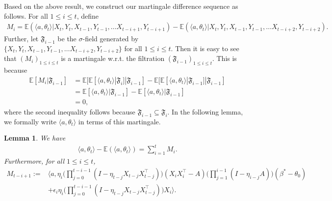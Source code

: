 \documentclass[11pt, reqno,english]{amsart}
\newtheorem{lemma}{Lemma}[section]
\begin{document}
Based on the above result, we construct our martingale difference sequence as follows. For all $1 \leq i \leq t$, define 
\begin{align*}
    M_{i} = \mathbb{E}(\langle a, \theta_t \rangle  | X_t, Y_t,X_{t-1}, Y_{t-1},\dots X_{t-i+1}, Y_{t-i+1})-\mathbb{E}(\langle a, \theta_t \rangle  | X_t,Y_t,X_{t-1}, Y_{t-1},\dots X_{t-i+2}, Y_{t-i+2}).
\end{align*}
Further, let $\mathfrak{F}_{i-1}$ be the $\sigma$-field generated by $\{X_t,Y_t, X_{t-1}, Y_{t-1},\dots X_{t-i+2}, Y_{t-i+2}\}$ for all $1 \leq i \leq t$. Then it is easy to see that $(M_i)_{1\leq i\leq t}$ is a martingale w.r.t. the filtration $(\mathfrak{F}_{i-1})_{1\leq i\leq t}$. This is because
\begin{align*}
\mathbb{E}[M_i | \mathfrak{F}_{i-1}] &=  \mathbb{E}[\mathbb{E}[\langle a, \theta_t \rangle| \mathfrak F_i] |  \mathfrak F_{i-1}] - \mathbb{E}[\mathbb{E}[\langle a, \theta_t \rangle| \mathfrak F_{i-1}] |  \mathfrak F_{i-1}]
\\
&= \mathbb{E}[\langle a, \theta_t \rangle| \mathfrak F_{i-1}] - \mathbb{E}[\langle a, \theta_t \rangle| \mathfrak F_{i-1}]
\\
&= 0,
\end{align*}
where the second inequality follows because $\mathfrak{F}_{i-1} \subseteq \mathfrak{F}_i$.
In the following lemma, we formally write $\langle a, \theta_t \rangle$ in terms of this martingale.

\begin{lemma}\label{lemma:martingalerep}
We have
\begin{align*}
    \langle a, \theta_t \rangle - \mathbb{E}(\langle a, \theta_t \rangle) = \sum_{i=1}^{t} M_i.
\end{align*}
Furthermore, for all $1 \leq i \leq t$,
\begin{align*}
    M_{t - i + 1} := &\bigg \langle a, \eta_i\bigg(\prod_{j = 0}^{t-i-1}(I - \eta_{t-j}X_{t-j}X^\top_{t-j})\bigg)(X_iX_i^\top - A) \bigg(\prod_{j = 1}^{i-1}(I - \eta_{i-j}A)\bigg)(\beta^* - \theta_0) \nonumber\\
    &+\epsilon_i \eta_i\bigg(\prod_{j = 0}^{t-i-1}(I - \eta_{t-j}X_{t-j}X^\top_{t-j})\bigg) X_i \bigg \rangle. 
\end{align*}
\end{lemma}
\end{document}
